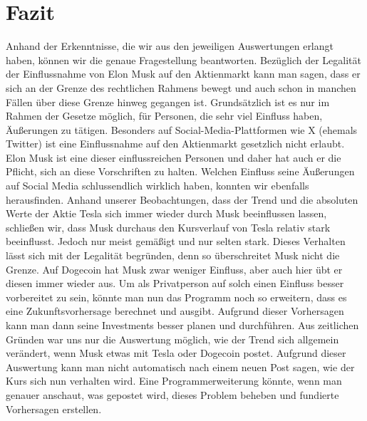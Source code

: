 \documentclass{article}
\begin{document}
\section{Fazit} \label{Fazit}
Anhand der Erkenntnisse, die wir aus den jeweiligen Auswertungen erlangt haben, können wir die genaue Fragestellung beantworten. Bezüglich der Legalität der Einflussnahme von Elon Musk auf den Aktienmarkt kann man sagen, dass er sich an der Grenze des rechtlichen Rahmens bewegt und auch schon in manchen Fällen über diese Grenze hinweg gegangen ist. Grundsätzlich ist es nur im Rahmen der Gesetze möglich, für Personen, die sehr viel Einfluss haben, Äußerungen zu tätigen. Besonders auf Social-Media-Plattformen wie X (ehemals Twitter) ist eine Einflussnahme auf den Aktienmarkt gesetzlich nicht erlaubt. Elon Musk ist eine dieser einflussreichen Personen und daher hat auch er die Pflicht, sich an diese Vorschriften zu halten.
Welchen Einfluss seine Äußerungen auf Social Media schlussendlich wirklich haben, konnten wir ebenfalls herausfinden. Anhand unserer Beobachtungen, dass der Trend und die absoluten Werte der Aktie Tesla sich immer wieder durch Musk beeinflussen lassen, schließen wir, dass Musk durchaus den Kursverlauf von Tesla relativ stark beeinflusst. Jedoch nur meist gemäßigt und nur selten stark. Dieses Verhalten lässt sich mit der Legalität begründen, denn so überschreitet Musk nicht die Grenze.
Auf Dogecoin hat Musk zwar weniger Einfluss, aber auch hier übt er diesen immer wieder aus. Um als Privatperson auf solch einen Einfluss besser vorbereitet zu sein, könnte man nun das Programm noch so erweitern, dass es eine Zukunftsvorhersage berechnet und ausgibt. Aufgrund dieser Vorhersagen kann man dann seine Investments besser planen und durchführen. Aus zeitlichen Gründen war uns nur die Auswertung möglich, wie der Trend sich allgemein verändert, wenn Musk etwas mit Tesla oder Dogecoin postet. Aufgrund dieser Auswertung kann man nicht automatisch nach einem neuen Post sagen, wie der Kurs sich nun verhalten wird. Eine Programmerweiterung könnte, wenn man genauer anschaut, was gepostet wird, dieses Problem beheben und fundierte Vorhersagen erstellen.
\end{document}
